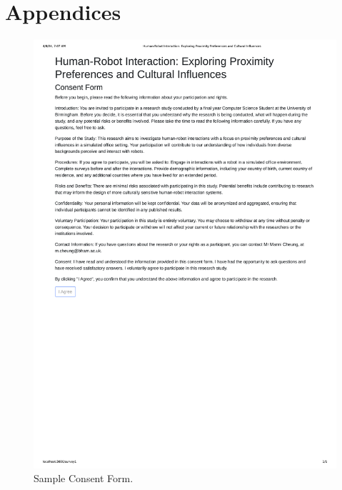 \chapter{Appendices}

\begin{figure}
    \begin{center}
       \noindent\includegraphics[width=\linewidth]{Appendices/consent.png}  
        \caption{Sample Consent Form.}
        \label{fig:figure1}
    \end{center}
\end{figure}

